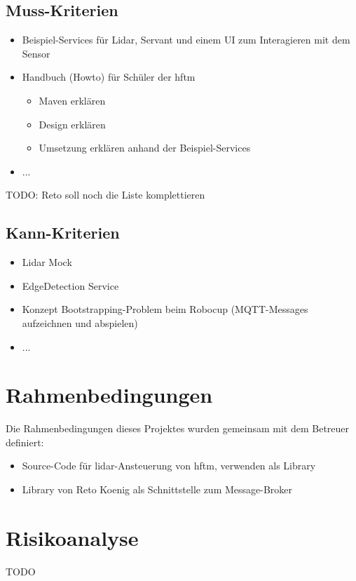 \subsection{Muss-Kriterien}
\begin{itemize}
	\item Beispiel-Services für Lidar, Servant und einem UI zum Interagieren mit dem Sensor
	\item Handbuch (Howto) für Schüler der \acrshort{hftm}
	\begin{itemize}
		\item Maven erklären
		\item Design erklären
		\item Umsetzung erklären anhand der Beispiel-Services
	\end{itemize}
	\item ...
\end{itemize}

TODO:
Reto soll noch die Liste komplettieren
\subsection{Kann-Kriterien}
\begin{itemize}
	\item Lidar Mock
	\item EdgeDetection Service
	\item Konzept Bootstrapping-Problem beim Robocup (MQTT-Messages aufzeichnen und abspielen)
	\item ...
\end{itemize}

\section{Rahmenbedingungen}
Die Rahmenbedingungen dieses Projektes wurden gemeinsam mit dem Betreuer definiert:
\begin{itemize}
	\item Source-Code für \acrshort{lidar}-Ansteuerung von \acrshort{hftm}, verwenden als Library
	\item Library  \cite{ch.quantasy.mqtt.gateway} von Reto Koenig als Schnittstelle zum Message-Broker
\end{itemize}

\section{Risikoanalyse}
TODO

